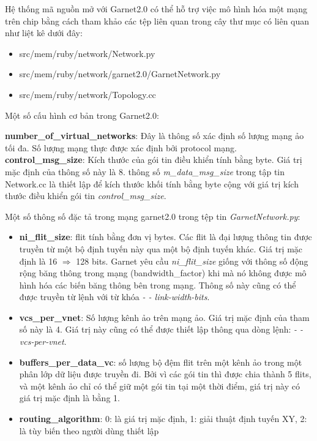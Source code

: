 \documentclass{article}
\begin{document}
Hệ thống mã nguồn mở với Garnet2.0 có thể hỗ trợ việc mô hình hóa một mạng trên chip bằng cách tham khảo các tệp liên quan trong cây thư mục có liên quan như liệt kê dưới đây:

\begin{itemize}
	\item src/mem/ruby/network/Network.py 
	\item src/mem/ruby/network/garnet2.0/GarnetNetwork.py 
	\item src/mem/ruby/network/Topology.cc 
\end{itemize}
 
 Một số cấu hình cơ bản trong Garnet2.0:
 
          \textbf{number\_of\_virtual\_networks}: Đây là thông số xác định số lượng mạng ảo tối đa. Số lượng mạng thực được xác định bởi protocol mạng.
          \textbf{control\_msg\_size}: Kích thước của gói tin điều khiển tính bằng byte. Giá trị mặc định của thông số này là 8. thông số \textit{m\_data\_msg\_size} trong tập tin Network.cc là thiết lập để kích thước khối tính bằng byte cộng với giá trị kích thước điều khiển gói tin \textit{control\_msg\_size}.
          
Một số thông số đặc tả trong mạng garnet2.0 trong tệp tin \textit{GarnetNetwork.py}:
\begin{itemize}
	\item \textbf{ni\_flit\_size}: flit tính bằng đơn vị bytes. Các flit là đại lượng thông tin được truyền từ một bộ định tuyến này qua một bộ định tuyến khác. Giá trị mặc định là 16  $\Rightarrow$ 128 bits. Garnet yêu cầu \textit{ni\_flit\_size} giống với thông số động rộng băng thông trong mạng (bandwidth\_factor) khi mà nó không được mô hình hóa các biến băng thông bên trong mạng. Thông số này cũng có thể được truyền từ lệnh với từ khóa\textit{ - - link-width-bits}.
	\item \textbf{vcs\_per\_vnet}: Số lượng kênh ảo trên mạng ảo. Giá trị mặc định của tham số này là 4. Giá trị này cũng có thể được thiết lập thông qua dòng lệnh: \textit{- - vcs-per-vnet}.
	\item \textbf{buffers\_per\_data\_vc}: số lượng bộ đệm flit trên một kênh ảo trong một phân lớp dữ liệu được truyền đi. Bởi vì các gói tin thì được chia thành 5 flits, và một kênh ảo chỉ có thể giữ một gói tin tại một thời điểm, giá trị này có giá trị mặc định là bằng 1.
	\item \textbf{routing\_algorithm}: 0: là giá trị mặc định, 1: giải thuật định tuyến XY, 2: là tùy biến theo người dùng thiết lập
\end{itemize}
\end{document}
